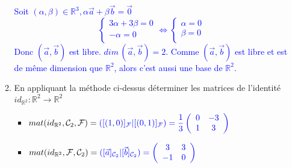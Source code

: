 \documentclass[a4paper,12pt]{article}
\def\R{\mathbb{R}}
\newcommand{\add}[1]{\textcolor{blue}{#1}}
\begin{document}
\begin{exercice}
\begin{enumerate}
\begin{enumerate}
                     \add{
                         Soit $( \alpha , \beta ) \in \R^3, \alpha \vec{a} + \beta \vec{b} = \vec{0}$
                         $$
                         \left\{
                         \begin{aligned}
                             3 \alpha + 3 \beta = 0\\
                             - \alpha = 0\\
                         \end{aligned}
                         \right.
                         \iff
                         \left\{
                         \begin{aligned}
                             \alpha= 0\\
                             \beta= 0\\
                         \end{aligned}
                         \right.
                         $$
                         Donc $(\vec{a},\vec{b})$ est libre. $dim\, (\vec{a},\vec{b}) = 2$. Comme $(\vec{a},\vec{b})$ est libre et est de même dimension que $\R^2$, alors c'est aussi une base de $\R^2$.
                     }

                 \item En appliquant la méthode ci-dessus déterminer les matrices de l'identité 
                     $id_{\R^2} : \R^2 \to \R^2$ \\
                                         \begin{itemize}
                                             \item $ mat(id_{\R^2},\mathcal C_2, \mathcal F) = \add{([(1,0)]_{\mathcal F}|[(0,1)]_{\mathcal F})= \dfrac{1}{3}
                             \left(
                             \begin{array}{cc}
                                 0 & -3 \\
                                 1 & 3
                             \end{array}
                             \right)
                         } $ \\
                     
                     \item $ mat(id_{\R^2},\mathcal F, \mathcal C_2) = \add{([\vec{a}]_{\mathcal C_2}|[\vec{b}]_{\mathcal C_2})=
                             \left(
                             \begin{array}{cc}
                                 3 & 3 \\
                                 -1 & 0
                             \end{array}
                             \right)}$ \\
                 \end{itemize}


\end{enumerate}
\end{enumerate}
\end{exercice}
\end{document}
